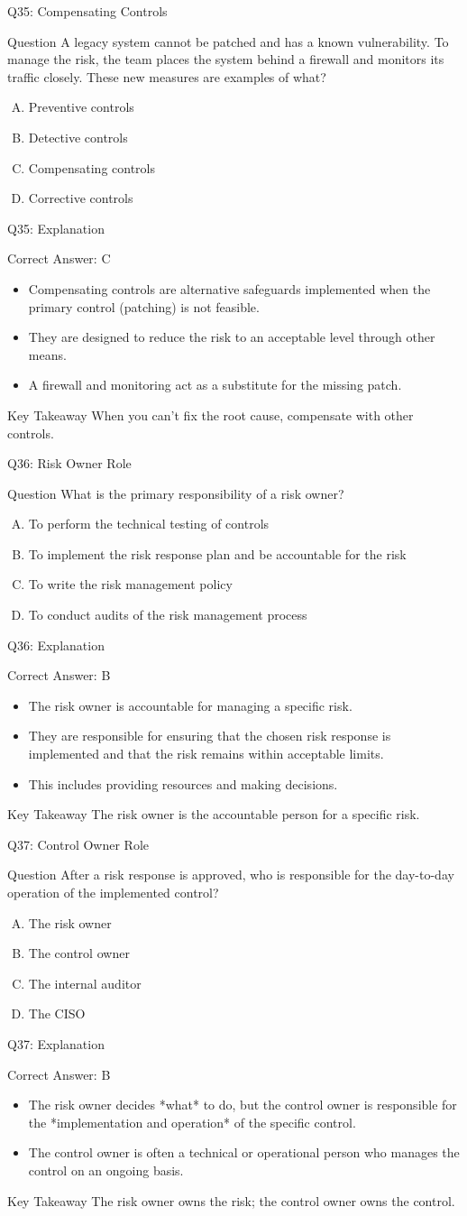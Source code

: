 \documentclass[aspectratio=169]{beamer}
\newcommand{\hq}[7]{%
	\begin{frame}{Q#1: #2}
		\begin{block}{Question}
			#3
		\end{block}
		\begin{enumerate}[(A)]
			#4
		\end{enumerate}
	\end{frame}
	\begin{frame}{Q#1: Explanation}
		\begin{block}{Correct Answer: #5}
			\begin{itemize}
				#6
			\end{itemize}
		\end{block}
		\begin{alertblock}{Key Takeaway}
			#7
		\end{alertblock}
	\end{frame}
}
\begin{document}
	\hq{35}{Compensating Controls}
	{A legacy system cannot be patched and has a known vulnerability. To manage the risk, the team places the system behind a firewall and monitors its traffic closely. These new measures are examples of what?}
	{\item Preventive controls
		\item Detective controls
		\item Compensating controls
		\item Corrective controls}
	{C}
	{\item Compensating controls are alternative safeguards implemented when the primary control (patching) is not feasible.
		\item They are designed to reduce the risk to an acceptable level through other means.
		\item A firewall and monitoring act as a substitute for the missing patch.}
	{When you can't fix the root cause, compensate with other controls.}
	
	\hq{36}{Risk Owner Role}
	{What is the primary responsibility of a risk owner?}
	{\item To perform the technical testing of controls
		\item To implement the risk response plan and be accountable for the risk
		\item To write the risk management policy
		\item To conduct audits of the risk management process}
	{B}
	{\item The risk owner is accountable for managing a specific risk.
		\item They are responsible for ensuring that the chosen risk response is implemented and that the risk remains within acceptable limits.
		\item This includes providing resources and making decisions.}
	{The risk owner is the accountable person for a specific risk.}
	
	\hq{37}{Control Owner Role}
	{After a risk response is approved, who is responsible for the day-to-day operation of the implemented control?}
	{\item The risk owner
		\item The control owner
		\item The internal auditor
		\item The CISO}
	{B}
	{\item The risk owner decides *what* to do, but the control owner is responsible for the *implementation and operation* of the specific control.
		\item The control owner is often a technical or operational person who manages the control on an ongoing basis.}
	{The risk owner owns the risk; the control owner owns the control.}
	
\end{document}
